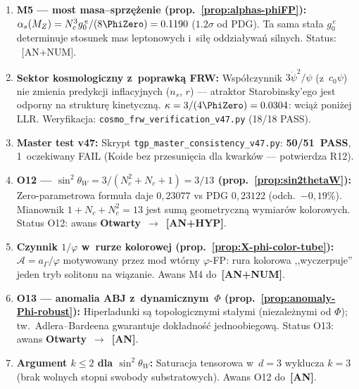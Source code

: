 \begin{remark}
\begin{enumerate}[nosep]
  \item \textbf{M5 --- most masa--sprz\k{e}\.zenie
    (prop.~\ref{prop:alphas-phiFP}):}
    $\alpha_s(M_Z) = N_c^3 g_0^{\,e}/(8\PhiZero) = 0.1190$
    ($1.2\sigma$ od PDG). Ta sama sta\l{}a $g_0^{\,e}$
    determinuje stosunek mas leptonowych i~si\l{}\k{e}
    oddzia\l{}ywa\'n silnych. Status: ~[AN+NUM].

  \item \textbf{Sektor kosmologiczny z~poprawk\k{a} FRW:}
    Wsp\'o\l{}czynnik $3\dot\psi^2/\psi$ (z~$c_0\psi$) nie zmienia
    predykcji inflacyjnych ($n_s$, $r$) --- atraktor
    Starobinsky'ego jest odporny na struktur\k{e} kinetyczn\k{a}.
    $\kappa = 3/(4\PhiZero) = 0.0304$: wci\k{a}\.z poni\.zej LLR.
    Weryfikacja: \texttt{cosmo\_frw\_verification\_v47.py} (18/18 PASS).

  \item \textbf{Master test v47:}
    Skrypt \texttt{tgp\_master\_consistency\_v47.py}:
    \textbf{50/51~PASS}, 1~oczekiwany FAIL
    (Koide bez przesuni\k{e}cia dla kwark\'ow --- potwierdza R12).

  \item \textbf{O12 --- $\sin^2\theta_W = 3/(N_c^2{+}N_c{+}1) = 3/13$
    (prop.~\ref{prop:sin2thetaW}):}
    Zero-parametrowa formu\l{}a daje $0{,}23077$ vs PDG $0{,}23122$
    (odch.\ $-0{,}19\%$). Mianownik $1 + N_c + N_c^2 = 13$
    jest sum\k{a} geometryczn\k{a} wymiar\'ow kolorowych.
    Status O12: awans \textbf{Otwarty}~$\to$~\textbf{[AN+HYP]}.

  \item \textbf{Czynnik $1/\varphi$ w~rurze kolorowej
    (prop.~\ref{prop:X-phi-color-tube}):}
    $\mathcal{A} = a_\Gamma/\varphi$ motywowany przez mod
    wt\'orny $\varphi$-FP: rura kolorowa ,,wyczerpuje'' jeden
    tryb solitonu na wi\k{a}zanie. Awans M4 do~\textbf{[AN+NUM]}.

  \item \textbf{O13 --- anomalia ABJ z~dynamicznym~$\Phi$
    (prop.~\ref{prop:anomaly-Phi-robust}):}
    Hiperladunki s\k{a} topologicznymi sta\l{}ymi
    (niezale\.znymi od $\Phi$); tw.~Adlera--Bardeena
    gwarantuje dok\l{}adno\'s\'c jednoobiegow\k{a}.
    Status O13: awans \textbf{Otwarty}~$\to$~\textbf{[AN]}.

  \item \textbf{Argument $k \le 2$ dla $\sin^2\theta_W$:}
    Saturacja tensorowa w~$d = 3$ wyklucza $k{=}3$
    (brak wolnych stopni swobody substratowych).
    Awans O12 do~\textbf{[AN]}.


\end{enumerate}
\end{remark}
